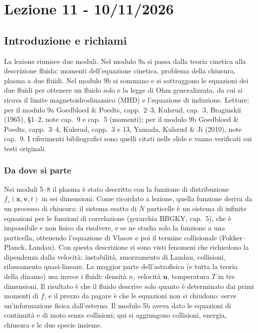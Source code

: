 \chapter{Lezione 11 - 10/11/2026}

\section{Introduzione e richiami}
La lezione riunisce due moduli. Nel modulo 9a si passa dalla teoria cinetica alla descrizione fluida: momenti dell'equazione cinetica, problema della chiusura, plasma a due fluidi. Nel modulo 9b si sommano e si sottraggono le equazioni dei due fluidi per ottenere un fluido solo e la legge di Ohm generalizzata, da cui si ricava il limite magnetoidrodinamico (MHD) e l'equazione di induzione. Letture: per il modulo 9a Goedbloed \& Poedts, capp.~2--3, Kulsrud, cap.~3, Braginskii (1965), \S1--2, note cap.~9 e cap.~5 (momenti); per il modulo 9b Goedbloed \& Poedts, capp.~3--4, Kulsrud, capp.~3 e 13, Yamada, Kulsrud \& Ji (2010), note cap.~9. I riferimenti bibliografici sono quelli citati nelle slide e vanno verificati sui testi originali.

\subsection{Da dove si parte}
Nei moduli 5--8 il plasma è stato descritto con la funzione di distribuzione $f_s(\mathbf{x},\mathbf{v},t)$ in sei dimensioni. Come ricordato a lezione, quella funzione deriva da un processo di chiusura: il sistema esatto di $N$ particelle è un sistema di infinite equazioni per le funzioni di correlazione (gerarchia BBGKY, cap.~5), che è impossibile e non fisico da risolvere, e se ne studia solo la funzione a una particella, ottenendo l'equazione di Vlasov e poi il termine collisionale (Fokker--Planck, Landau). Con questa descrizione si sono visti fenomeni che richiedono la dipendenza dalla velocità: instabilità, smorzamento di Landau, collisioni, rilassamento quasi-lineare.
La maggior parte dell'astrofisica (e tutta la teoria della dinamo) usa invece i fluidi: densità $n$, velocità $\mathbf{u}$, temperatura $T$ in tre dimensioni. Il risultato è che il fluido descrive solo quanto è determinato dai primi momenti di $f$, e il prezzo da pagare è che le equazioni non si chiudono: serve un'informazione fisica dall'esterno. Il modulo 5b aveva dato le equazioni di continuità e di moto senza collisioni; qui si aggiungono collisioni, energia, chiusura e le due specie insieme.

